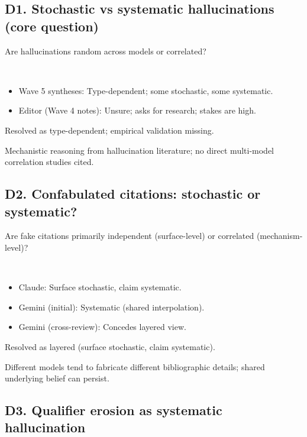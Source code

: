 \documentclass[11pt,letterpaper]{article}
\begin{document}
\subsection{D1. Stochastic vs systematic hallucinations (core question)}

\begin{reflist}
\item[Dispute:] Are hallucinations random across models or correlated?
\item[Positions:]~
  \begin{itemize}[nosep]
    \item Wave 5 syntheses: Type-dependent; some stochastic, some systematic.
    \item Editor (Wave 4 notes): Unsure; asks for research; stakes are high.
  \end{itemize}
\item[Status:] Resolved as type-dependent; empirical validation missing.
\item[Evidence:] Mechanistic reasoning from hallucination literature; no direct multi-model correlation studies cited.
\end{reflist}

\subsection{D2. Confabulated citations: stochastic or systematic?}

\begin{reflist}
\item[Dispute:] Are fake citations primarily independent (surface-level) or correlated (mechanism-level)?
\item[Positions:]~
  \begin{itemize}[nosep]
    \item Claude: Surface stochastic, claim systematic.
    \item Gemini (initial): Systematic (shared interpolation).
    \item Gemini (cross-review): Concedes layered view.
  \end{itemize}
\item[Status:] Resolved as layered (surface stochastic, claim systematic).
\item[Evidence:] Different models tend to fabricate different bibliographic details; shared underlying belief can persist.
\end{reflist}

\subsection{D3. Qualifier erosion as systematic hallucination}
\end{document}

